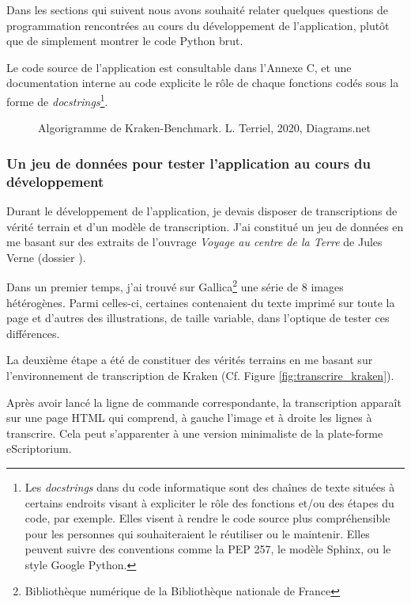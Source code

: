 Dans les sections qui suivent nous avons souhaité relater quelques questions de programmation rencontrées au cours du développement de l'application, plutôt que de simplement montrer le code Python brut. 

Le code source de l'application est consultable dans l'Annexe C, et une documentation interne au code explicite le rôle de chaque fonctions codés sous la forme de \textit{docstrings}\footnote{Les \textit{docstrings} dans du code informatique sont des chaînes de texte situées à certains endroits visant à expliciter le rôle des fonctions et/ou des étapes du code, par exemple. Elles visent à rendre le code source plus compréhensible pour les personnes qui souhaiteraient le réutiliser ou le maintenir. Elles peuvent suivre des conventions comme la PEP 257, le modèle Sphinx, ou le style Google Python.}. 

\begin{figure}[H]
    \centering
    \centerline{}
    \caption{Algorigramme de Kraken-Benchmark.   \textcopyright L. Terriel, 2020, Diagrams.net}
    \label{fig:algo-kb}
\end{figure}

\subsubsection{Un jeu de données pour tester l'application au cours du développement}

Durant le développement de l'application, je devais disposer de transcriptions de vérité terrain et d'un modèle de transcription. J'ai constitué un jeu de données en me basant sur des extraits de l'ouvrage \textit{Voyage au centre de la Terre} de Jules Verne (dossier ).

Dans un premier temps, j'ai trouvé sur Gallica\footnote{Bibliothèque numérique de la Bibliothèque nationale de France} une série de 8 images hétérogènes. Parmi celles-ci, certaines contenaient du texte imprimé sur toute la page et d'autres des illustrations, de taille variable, dans l'optique de tester ces différences. 

La deuxième étape a été de constituer des vérités terrains en me basant sur l'environnement de transcription de Kraken (Cf. Figure \ref{fig:transcrire_kraken}). 

Après avoir lancé la ligne de commande correspondante, la transcription apparaît sur une page HTML qui comprend, à gauche l'image et à droite les lignes à transcrire. Cela peut s'apparenter à une version minimaliste de la plate-forme eScriptorium.   

